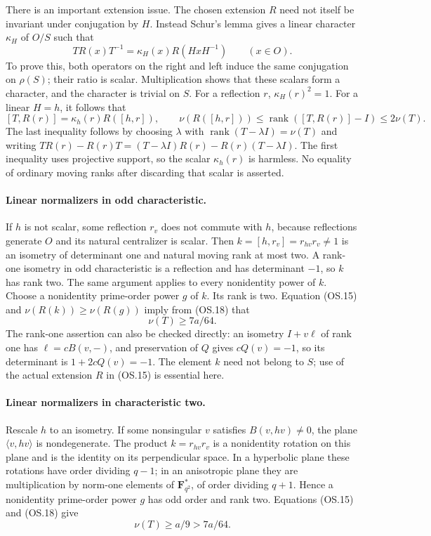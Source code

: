 There is an important extension issue.  The chosen extension $R$
need not itself be invariant under conjugation by $H$.  Instead
Schur's lemma gives a linear character $\kappa_H$ of $O/S$ such that
\[
 T R(x)T^{-1}=\kappa_H(x)R(HxH^{-1})\qquad(x\in O).
 \tag{OS.17}
\]
To prove this, both operators on the right and left induce the
same conjugation on $\rho(S)$; their ratio is scalar.  Multiplication
shows that these scalars form a character, and the character is
trivial on $S$.  For a reflection $r$, $\kappa_H(r)^2=1$.
For a linear $H=h$, it follows that
\[
 [T,R(r)]=\kappa_h(r)R([h,r]),\qquad
 \nu(R([h,r]))\le\operatorname{rank}([T,R(r)]-I)\le2\nu(T).
 \tag{OS.18}
\]
The last inequality follows by choosing $\lambda$ with
$\operatorname{rank}(T-\lambda I)=\nu(T)$ and writing
$TR(r)-R(r)T=(T-\lambda I)R(r)-R(r)(T-\lambda I)$.
The first inequality uses projective support, so the scalar
$\kappa_h(r)$ is harmless.  No equality of ordinary moving ranks
after discarding that scalar is asserted.

\paragraph{Linear normalizers in odd characteristic.}
If $h$ is not scalar, some reflection $r_v$ does not commute with
$h$, because reflections generate $O$ and its natural centralizer
is scalar.  Then
$k=[h,r_v]=r_{hv}r_v\ne1$ is an isometry of determinant one and
natural moving rank at most two.  A rank-one isometry in odd
characteristic is a reflection and has determinant $-1$, so $k$
has rank two.  The same argument applies to every nonidentity
power of $k$.  Choose a nonidentity prime-order power $g$ of $k$.
Its rank is two.  Equation (OS.15) and
$\nu(R(k))\ge\nu(R(g))$ imply from (OS.18) that
\[
                         \nu(T)\ge7a/64.
 \tag{OS.19}
\]
The rank-one assertion can also be checked directly: an isometry
$I+v\ell$ of rank one has $\ell=cB(v,-)$, and preservation of $Q$
gives $cQ(v)=-1$, so its determinant is $1+2cQ(v)=-1$.
The element $k$ need not belong to $S$; use of the actual extension
$R$ in (OS.15) is essential here.

\paragraph{Linear normalizers in characteristic two.}
Rescale $h$ to an isometry.  If some nonsingular $v$ satisfies
$B(v,hv)\ne0$, the plane $\langle v,hv\rangle$ is nondegenerate.
The product $k=r_{hv}r_v$ is a nonidentity rotation on this plane
and is the identity on its perpendicular space.  In a hyperbolic
plane these rotations have order dividing $q-1$; in an anisotropic
plane they are multiplication by norm-one elements of
$\mathbf F_{q^2}^*$, of order dividing $q+1$.  Hence a nonidentity
prime-order power $g$ has odd order and rank two.  Equations
(OS.15) and (OS.18) give
\[
                         \nu(T)\ge a/9>7a/64.
 \tag{OS.20}
\]

